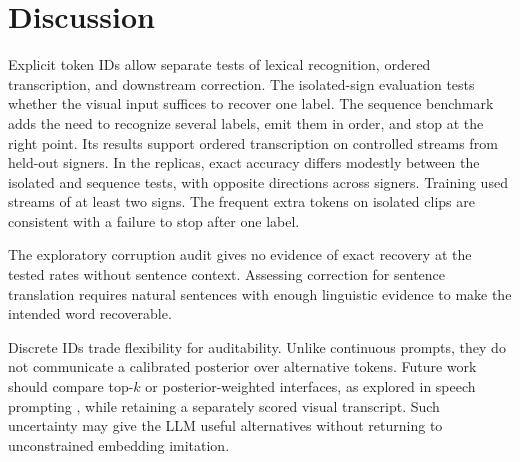 \section{Discussion}

Explicit token IDs allow separate tests of lexical recognition, ordered
transcription, and downstream correction.  The isolated-sign evaluation tests
whether the visual input suffices to recover one label.  The sequence benchmark
adds the need to recognize several labels, emit them in order, and stop at the
right point.  Its results support ordered transcription on controlled streams
from held-out signers. In the replicas, exact accuracy differs modestly between
the isolated and sequence tests, with opposite directions across signers.
Training used streams of at least two signs. The frequent extra tokens on
isolated clips are consistent with a failure to stop after one label.

The exploratory corruption audit gives no evidence of exact recovery at the
tested rates without sentence context.  Assessing correction for sentence
translation requires natural sentences with enough linguistic evidence to make
the intended word recoverable.

Discrete IDs trade flexibility for auditability.  Unlike continuous prompts, they
do not communicate a calibrated posterior over alternative tokens.  Future work
should compare top-$k$ or posterior-weighted interfaces, as explored in speech
prompting \citep{deng2025wav2prompt,ma2025legoslm}, while retaining a separately
scored visual transcript.  Such uncertainty may give the LLM useful alternatives
without returning to unconstrained embedding imitation.
